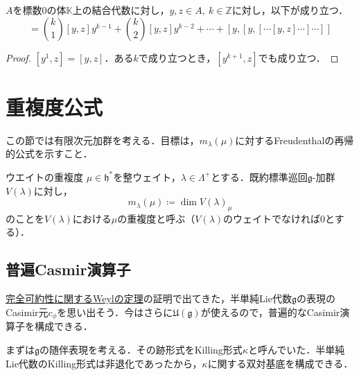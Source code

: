 \documentclass[rep_main]{subfiles}
\begin{document}
\begin{mylem}[label=lem:Lie-bracket-power]{}
	$A$を標数$0$の体$\mathbb{K}$上の結合代数に対し，$y, z \in A,\ k \in \mathbb{Z}$に対し，以下が成り立つ．
	\begin{equation}
		[y^k, z] = \binom{k}{1}[y,z]y^{k-1} + \binom{k}{2}[y,z]y^{k-2} + \cdots + [y,[y, [\cdots [y, z]\cdots ]\cdots ]]
	\end{equation}
\end{mylem}
\begin{proof}
	$[y^1, z] = [y, z]$．ある$k$で成り立つとき，$[y^{k+1}, z]$でも成り立つ．
\end{proof}

\section{重複度公式}
この節では有限次元加群を考える．目標は，$m_\lambda(\mu)$に対するFreudenthalの再帰的公式を示すこと．
\begin{mydef}[label=def:mutiplicity]{ウエイトの重複度}
	$\mu \in \mathfrak{h}^*$を整ウェイト，$\lambda \in \Lambda^+$とする．既約標準巡回$\mathfrak{g}$-加群$V(\lambda)$に対し，
	\begin{equation}
		m_\lambda(\mu) \coloneqq \dim V(\lambda)_\mu
	\end{equation}
	のことを$V(\lambda)$における$\mu$の重複度と呼ぶ（$V(\lambda)$のウェイトでなければ$0$とする）．
\end{mydef}

\subsection{普遍Casmir演算子}
\hyperref[thm:Weyl]{完全可約性に関するWeylの定理}の証明で出てきた，半単純Lie代数$\mathfrak{g}$の表現のCasimir元$c_\phi$を思い出そう．今はさらに$\mathfrak{U}(\mathfrak{g})$が使えるので，普遍的なCasimir演算子を構成できる．

まずは$\mathfrak{g}$の随伴表現を考える．その跡形式をKilling形式$\kappa$と呼んでいた．半単純Lie代数のKilling形式は非退化であったから，$\kappa$に関する双対基底を構成できる．
\end{document}
